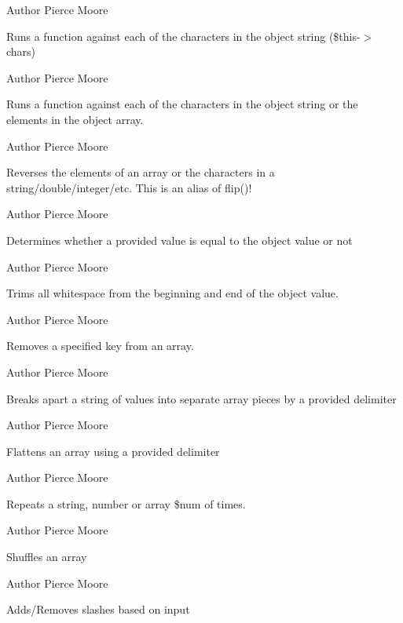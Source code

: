 \begin{DoxyAuthor}{Author}
Pierce Moore
\end{DoxyAuthor}
Runs a function against each of the characters in the object string (\$this-\/$>$chars)

\begin{DoxyAuthor}{Author}
Pierce Moore
\end{DoxyAuthor}
Runs a function against each of the characters in the object string or the elements in the object array.

\begin{DoxyAuthor}{Author}
Pierce Moore
\end{DoxyAuthor}
Reverses the elements of an array or the characters in a string/double/integer/etc. This is an alias of flip()!

\begin{DoxyAuthor}{Author}
Pierce Moore
\end{DoxyAuthor}
Determines whether a provided value is equal to the object value or not

\begin{DoxyAuthor}{Author}
Pierce Moore
\end{DoxyAuthor}
Trims all whitespace from the beginning and end of the object value.

\begin{DoxyAuthor}{Author}
Pierce Moore
\end{DoxyAuthor}
Removes a specified key from an array.

\begin{DoxyAuthor}{Author}
Pierce Moore
\end{DoxyAuthor}
Breaks apart a string of values into separate array pieces by a provided delimiter

\begin{DoxyAuthor}{Author}
Pierce Moore
\end{DoxyAuthor}
Flattens an array using a provided delimiter

\begin{DoxyAuthor}{Author}
Pierce Moore
\end{DoxyAuthor}
Repeats a string, number or array \$num of times.

\begin{DoxyAuthor}{Author}
Pierce Moore
\end{DoxyAuthor}
Shuffles an array

\begin{DoxyAuthor}{Author}
Pierce Moore
\end{DoxyAuthor}
Adds/\-Removes slashes based on input

